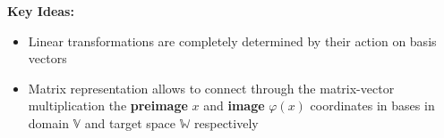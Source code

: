 \documentclass[a4paper]{article}
\begin{document}
\begin{center}
\end{center}

\vspace{1em}
\begin{center}
\textbf{Key Ideas:}
\begin{itemize}
    \item Linear transformations are completely determined by their action on basis vectors
    \item Matrix representation allows to connect through the matrix-vector multiplication the \textbf{preimage} $x$ and \textbf{image} $\varphi(x)$ coordinates in bases in domain $\mathbb{V}$ and target space $\mathbb{W}$ respectively
\end{itemize}
\end{center}
\end{document}
